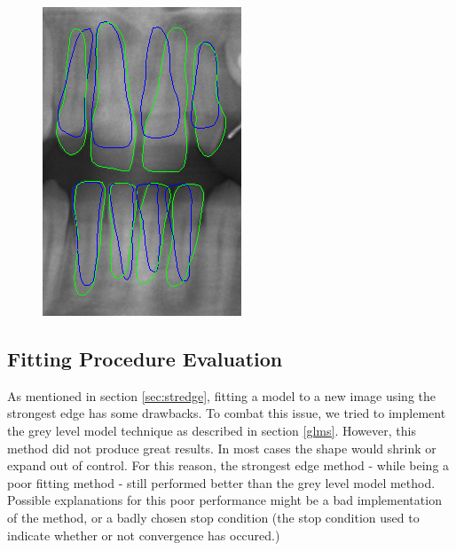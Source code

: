 \documentclass[11pt]{article}
\begin{document}
\begin{figure}[H]
\begin{minipage}{.4\textwidth}
  \includegraphics[width=\linewidth]{02_method2_auto}
  \label{fig:method2auto}
\end{minipage}
\end{figure}

\subsection{Fitting Procedure Evaluation}

As mentioned in section \ref{sec:stredge}, fitting a model to a new image using the strongest edge has some drawbacks. To combat this issue, we tried to implement the grey level model technique as described in section \ref{glms}. However, this method did not produce great results. In most cases the shape would shrink or expand out of control. For this reason, the strongest edge method - while being a poor fitting method - still performed better than the grey level model method. Possible explanations for this poor performance might be a bad implementation of the method, or a badly chosen stop condition (the stop condition used to indicate whether or not convergence has occured.)
\end{document}
